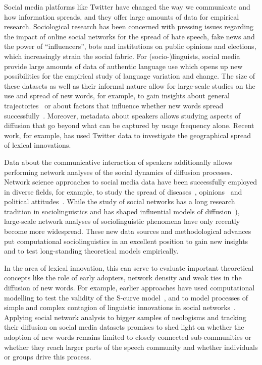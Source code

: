 \documentclass[
  a4paper,
  abstract=on,
  captions=tableabove
  ]{scrartcl}
\begin{document}
Social media platforms like Twitter have changed the way we communicate and how information spreads, and they offer large amounts of data for empirical research. Sociological research has been concerned with pressing issues regarding the impact of online social networks for the spread of hate speech, fake news and the power of \enquote{influencers}, bots and institutions on public opinions and elections, which increasingly strain the social fabric. For (socio-)linguists, social media provide large amounts of data of authentic language use which opens up new possibilities for the empirical study of language variation and change. The size of these datasets as well as their informal nature allow for large-scale studies on the use and spread of new words, for example, to gain insights about general trajectories~\parencite{Nini2017ApplicationGrowth} or about factors that influence whether new words spread successfully~\parencite{Grieve2018NaturalSelection}. Moreover, metadata about speakers allows studying aspects of diffusion that go beyond what can be captured by usage frequency alone. Recent work, for example, has used Twitter data to investigate the geographical spread of lexical innovations.~\parencite{Eisenstein2014DiffusionLexical,Grieve2017GeographicalPatterns,Grieve2018MappingLexical}

Data about the communicative interaction of speakers additionally allows performing network analyses of the social dynamics of diffusion processes. Network science approaches to social media data have been successfully employed in diverse fields, for example, to study the spread of diseases~\parencite{Lu2018AccurateInfluenza}, opinions~\parencite{West2014ExploitingSocial} and political attitudes~\parencite{PewResearchCenter2019NationalPolitics}. While the study of social networks has a long research tradition in sociolinguistics and has shaped influential models of diffusion~\parencite[e.g.][]{Milroy1985LinguisticChange}), large-scale network analyses of sociolinguistic phenomena have only recently become more widespread. These new data sources and methodological advances put computational sociolinguistics in an excellent position to gain new insights and to test long-standing theoretical models empirically.

In the area of lexical innovation, this can serve to evaluate important theoretical concepts like the role of early adopters, network density and weak ties  in the diffusion of new words. For example, earlier approaches have used computational modelling to test the validity of the S-curve model~\parencite{Blythe2012ScurvesMechanisms}, and to model processes of simple and complex contagion of linguistic innovations in social networks~\parencite{Goel2016SocialDynamics}. Applying social network analysis to bigger samples of neologisms and tracking their diffusion on social media datasets promises to shed light on whether the adoption of new words remains limited to closely connected sub-communities or whether they reach larger parts of the speech community and whether individuals or groups drive this process.
\end{document}
